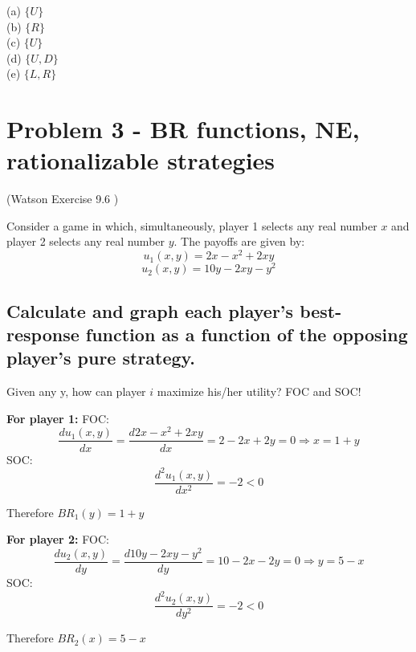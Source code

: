 \documentclass{article}
\begin{document}
(a) $\{U\}$ \\ \indent (b) $\{R\}$ \\ \indent (c) $\{U\}$ \\ \indent (d) $\{U,D\}$ \\ \indent (e) $\{L,R\}$

\bigskip

\section{Problem 3 - BR functions, NE, rationalizable strategies}

(Watson Exercise 9.6 )

Consider a game in which, simultaneously, player 1 selects any real number
$x$ and player 2 selects any real number $y$. The payoffs are given by:
$$u_1(x,y)= 2x-x^2+2xy$$
$$u_2(x,y)= 10y-2xy -y^2$$

\subsection{Calculate and graph each player's best-response function as a function
of the opposing player’s pure strategy.}

\begin{mdframed}[backgroundcolor=blue!20,linecolor=white]
Given any y, how can player $i$ maximize his/her utility? FOC and SOC!
\end{mdframed}

\textbf{For player 1:}
\medskip
FOC:
$$\frac{d u_1(x,y)}{d x} = \frac{d 2x-x^2+2xy}{d x} = 2 - 2x +2y =0 \Rightarrow x = 1+y$$
SOC: 
$$\frac{d^2 u_1(x,y)}{d x^2} = -2<0$$

Therefore  $BR_1(y) = 1+y$

\medskip

\textbf{For player 2:}
\medskip
FOC:
$$\frac{d u_2(x,y)}{d y} = \frac{d  10y-2xy -y^2}{d y} = 10-2x-2y =0 \Rightarrow y = 5-x$$
SOC: 
$$\frac{d^2 u_2(x,y)}{d y^2} = -2<0$$

Therefore  $BR_2(x) = 5-x$

\begin{center}
\label{fig:br}
\end{center}
\vspace{2mm}
\end{document}
